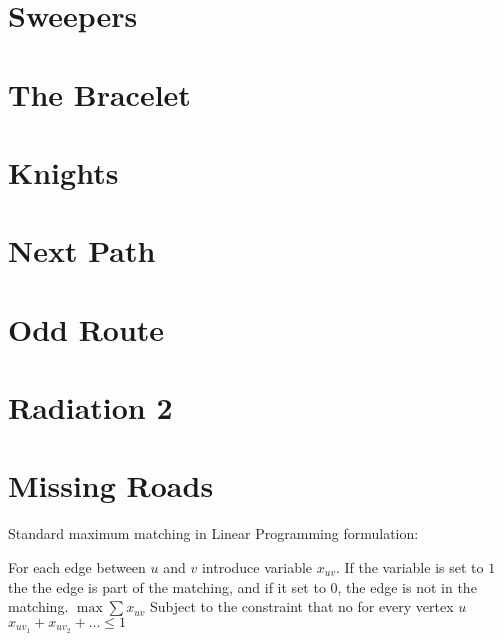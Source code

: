 \documentclass[a4paper, 10pt]{article}
\let\stdsection\section
\renewcommand\section{\newpage\stdsection}
\newcommand{\includecode}[1]{
    }
\newcommand{\algoAuthor}{2} %
\begin{document}
    \section{Sweepers}
        \label{sec:sweepers}
        \includecode{../problems/w12/Sweepers/Sweepers\algoAuthor.cpp}
        
    \section{The Bracelet}
        \label{sec:the_bracelet}
        \includecode{../problems/w12/The_Bracelet/TheBracelet\algoAuthor.cpp}
        
    
    \section{Knights}
        \label{sec:knights}
        \includecode{../problems/w13/Knights/Knights\algoAuthor.cpp}
        
    \section{Next Path}
        \label{sec:next_path}
        \includecode{../problems/w13/NextPath/NextPath\algoAuthor.cpp}
        
    \section{Odd Route}
        \label{sec:odd_route}
        \includecode{../problems/w13/OddRoute/OddRoute\algoAuthor.cpp}
        
    \section{Radiation 2}
        \label{sec:radiation_2}

    \section{Missing Roads}
        \label{sec:missing_roads}
        Standard maximum matching in Linear Programming formulation:

        For each edge between $u$ and $v$ introduce variable $x_{uv}$. If the variable is set to $1$ the the edge is part of the matching, 
        and if it set to 0, the edge is not in the matching.
        $\max \sum x_{uv}$
        Subject to the constraint that no for every vertex $u$
        $x_{uv_1} + x_{uv_2} + \dots \leq 1$
    
    
\end{document}
